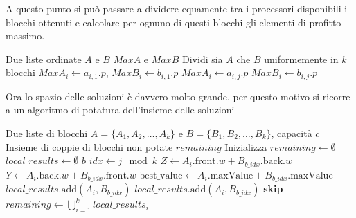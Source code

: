 \documentclass[11pt]{article}
\begin{document}
A questo punto si può passare a dividere equamente tra i processori disponibili i blocchi ottenuti e calcolare per ognuno di questi blocchi gli elementi di profitto massimo. 

\begin{algorithm}[H]
\caption{ALgoritmo di divisione e ricerca del massimo profitto per blocco}\label{alg:parallel_max}
\begin{algorithmic}
\Require Due liste ordinate $A$ e $B$
\Ensure $MaxA$ e $MaxB$
\State Dividi sia $A$ che $B$ uniformemente in $k$ blocchi
    \State $MaxA_i \gets a_{i,1}.p$, \quad $MaxB_i \gets b_{i,1}.p$
            \State $MaxA_i \gets a_{i,j}.p$
        \EndIf
            \State $MaxB_i \gets b_{i,j}.p$
        \EndIf
    \EndFor
\EndFor
\end{algorithmic}
\end{algorithm}

Ora lo spazio delle soluzioni è davvero molto grande, per questo motivo si ricorre a un algoritmo di potatura dell'insieme delle soluzioni 

\begin{algorithm}[H]
\caption{Algoritmo di pruning parallelo}\label{alg:parallel_pruning}
\begin{algorithmic}
\Require Due liste di blocchi $A = \{A_1, A_2, \ldots, A_k\}$ e $B = \{B_1, B_2, \ldots, B_k\}$, capacità $c$
\Ensure Insieme di coppie di blocchi non potate $remaining$
\State Inizializza $remaining \gets \emptyset$
    \State $local\_results \gets \emptyset$
        \State $b\_idx \gets j \mod k$
        \State $Z \gets A_i.\text{front}.w + B_{b\_idx}.\text{back}.w$
        \State $Y \gets A_i.\text{back}.w + B_{b\_idx}.\text{front}.w$
                \State $\text{best\_value} \gets A_i.\text{maxValue} + B_{b\_idx}.\text{maxValue}$
            \EndIf
            \State $local\_results.\text{add}(A_i, B_{b\_idx})$
            \State $local\_results.\text{add}(A_i, B_{b\_idx})$
        \Else
            \State \textbf{skip}
        \EndIf
    \EndFor
\EndFor
\State $remaining \gets \bigcup_{i=1}^{k} local\_results_i$
\end{algorithmic}
\end{algorithm}
\end{document}
